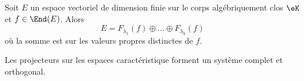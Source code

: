 \begin{theorem}     \label{ThoSpectraluRMLok}
    Soit \( E\) un espace vectoriel de dimension finie sur le corps algébriquement clos \( \eK\) et \( f\in\End(E)\). Alors
    \begin{equation}    \label{EqCTFHooBSGhYK}
        E=F_{\lambda_1}(f)\oplus\ldots\oplus F_{\lambda_k}(f)
    \end{equation}
    où la somme est sur les valeurs propres distinctes de \( f\).

    Les projecteurs sur les espaces caractéristique forment un système complet et orthogonal.
\end{theorem}


